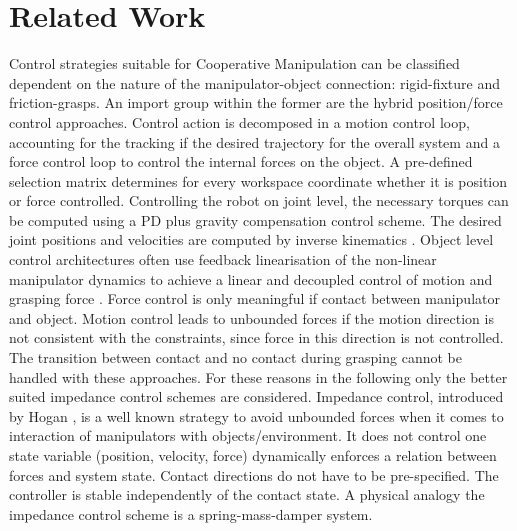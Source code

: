 \documentclass[a4paper,twoside, openright,12pt]{report}
\begin{document}
\section{Related Work}
Control strategies suitable for Cooperative Manipulation can be classified dependent on the nature of the manipulator-object connection: rigid-fixture and friction-grasps.
An import group within the former are the hybrid position/force control approaches. 
Control action is decomposed in a motion control loop, accounting for the tracking if the desired trajectory for the overall system and a force control loop to control the internal forces on the object. A pre-defined selection matrix determines for every workspace coordinate whether it is position or force controlled. Controlling the robot on joint level, the necessary torques can be computed using a PD plus gravity compensation control scheme. The desired joint positions and velocities are computed by inverse kinematics \cite{Wen_92}.
Object level control architectures often use feedback linearisation of the non-linear manipulator dynamics to achieve a linear and decoupled control of motion and grasping force \cite{Hsu_93}.
Force control is only meaningful if contact between manipulator and object. Motion control leads to unbounded forces if the motion direction is not consistent with the constraints,  since force in this direction is not controlled. The transition between contact and no contact during grasping cannot be handled with these approaches. For these reasons in the following only the better suited impedance control schemes are considered. Impedance control, introduced by Hogan \cite{Hogan_84}, is a well known strategy to avoid unbounded forces when it comes to interaction of manipulators with objects/environment. It does not control one state variable (position, velocity, force) dynamically enforces a relation between forces and system state. Contact directions do not have to be pre-specified. The controller is stable independently of the contact state.
A physical analogy the impedance control scheme is a spring-mass-damper system.\\  

%
\end{document}
